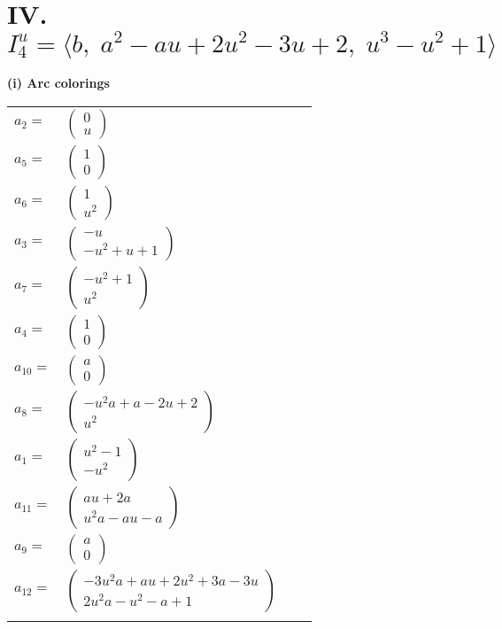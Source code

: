\documentclass[1p]{elsarticle_modified}
\theoremstyle{definition}
\begin{document}
\centering \section*{IV. $I^u_{4}= \langle b,\;a^2- a u+2 u^2-3 u+2,\;u^3- u^2+1 \rangle$}
\flushleft \textbf{(i) Arc colorings}\\
\begin{tabular}{m{7pt} m{180pt} m{7pt} m{180pt} }
\flushright $a_{2}=$&$\begin{pmatrix}0\\u\end{pmatrix}$ \\
\flushright $a_{5}=$&$\begin{pmatrix}1\\0\end{pmatrix}$ \\
\flushright $a_{6}=$&$\begin{pmatrix}1\\u^2\end{pmatrix}$ \\
\flushright $a_{3}=$&$\begin{pmatrix}- u\\- u^2+u+1\end{pmatrix}$ \\
\flushright $a_{7}=$&$\begin{pmatrix}- u^2+1\\u^2\end{pmatrix}$ \\
\flushright $a_{4}=$&$\begin{pmatrix}1\\0\end{pmatrix}$ \\
\flushright $a_{10}=$&$\begin{pmatrix}a\\0\end{pmatrix}$ \\
\flushright $a_{8}=$&$\begin{pmatrix}- u^2 a+a-2 u+2\\u^2\end{pmatrix}$ \\
\flushright $a_{1}=$&$\begin{pmatrix}u^2-1\\- u^2\end{pmatrix}$ \\
\flushright $a_{11}=$&$\begin{pmatrix}a u+2 a\\u^2 a- a u- a\end{pmatrix}$ \\
\flushright $a_{9}=$&$\begin{pmatrix}a\\0\end{pmatrix}$ \\
\flushright $a_{12}=$&$\begin{pmatrix}-3 u^2 a+a u+2 u^2+3 a-3 u\\2 u^2 a- u^2- a+1\end{pmatrix}$\\&\end{tabular}
\end{document}
